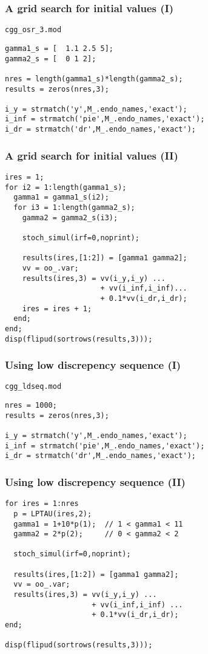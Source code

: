 \documentclass{beamer}
\begin{document}
\begin{frame}[fragile]
  \frametitle{A grid search for initial values (I)}
\verb+cgg_osr_3.mod+
\begin{verbatim}
gamma1_s = [  1.1 2.5 5];
gamma2_s = [  0 1 2];

nres = length(gamma1_s)*length(gamma2_s);
results = zeros(nres,3);

i_y = strmatch('y',M_.endo_names,'exact');
i_inf = strmatch('pie',M_.endo_names,'exact');
i_dr = strmatch('dr',M_.endo_names,'exact');
\end{verbatim}
\end{frame}

\begin{frame}[fragile]
  \frametitle{A grid search for initial values (II)}
\begin{verbatim}
ires = 1;
for i2 = 1:length(gamma1_s);
  gamma1 = gamma1_s(i2);
  for i3 = 1:length(gamma2_s);
    gamma2 = gamma2_s(i3);

    stoch_simul(irf=0,noprint);

    results(ires,[1:2]) = [gamma1 gamma2];
    vv = oo_.var;
    results(ires,3) = vv(i_y,i_y) ...
                      + vv(i_inf,i_inf)...
                      + 0.1*vv(i_dr,i_dr);
    ires = ires + 1;
  end;
end;
disp(flipud(sortrows(results,3)));
\end{verbatim}
\end{frame}

\begin{frame}[fragile]
  \frametitle{Using low discrepency sequence (I)}
\verb+cgg_ldseq.mod+
\begin{verbatim}
nres = 1000;
results = zeros(nres,3);

i_y = strmatch('y',M_.endo_names,'exact');
i_inf = strmatch('pie',M_.endo_names,'exact');
i_dr = strmatch('dr',M_.endo_names,'exact');
\end{verbatim}
\end{frame}

\begin{frame}[fragile]
  \frametitle{Using low discrepency sequence (II)}
\begin{verbatim}
for ires = 1:nres
  p = LPTAU(ires,2);  
  gamma1 = 1+10*p(1);  // 1 < gamma1 < 11
  gamma2 = 2*p(2);     // 0 < gamma2 < 2

  stoch_simul(irf=0,noprint);

  results(ires,[1:2]) = [gamma1 gamma2];
  vv = oo_.var;
  results(ires,3) = vv(i_y,i_y) ...
                    + vv(i_inf,i_inf) ...
                    + 0.1*vv(i_dr,i_dr);
end;

disp(flipud(sortrows(results,3)));
\end{verbatim}
\end{frame}
\end{document}
